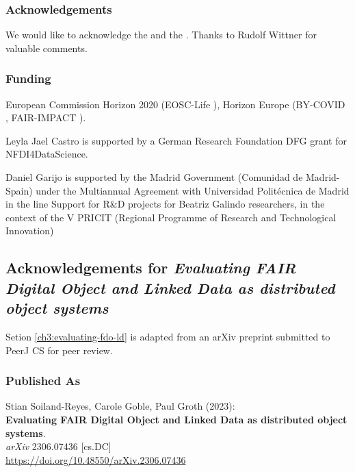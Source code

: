 \subsubsection*{Acknowledgements}

We would like to acknowledge the
 and the
. Thanks to Rudolf Wittner for valuable comments.

\subsubsection*{Funding}

European Commission Horizon 2020 (EOSC-Life
), Horizon
Europe (BY-COVID
,
FAIR-IMPACT
).

Leyla Jael Castro is supported by a German Research Foundation DFG grant
for NFDI4DataScience.

Daniel Garijo is supported by the Madrid Government (Comunidad de
Madrid-Spain) under the Multiannual Agreement with Universidad
Politécnica de Madrid in the line Support for R\&D projects for Beatriz
Galindo researchers, in the context of the V PRICIT (Regional Programme
of Research and Technological Innovation)


% 

\subsection{Acknowledgements for \textit{Evaluating FAIR Digital Object and Linked Data as distributed object systems}}

Setion \vref{ch3:evaluating-fdo-ld} is adapted from an arXiv preprint submitted to PeerJ CS for peer review.

\subsubsection*{Published As}

Stian Soiland-Reyes, Carole Goble, Paul Groth (2023):\\
\textbf{Evaluating FAIR Digital Object and Linked Data as distributed object systems}.\\
\emph{arXiv} 2306.07436 [cs.DC] \\
\url{https://doi.org/10.48550/arXiv.2306.07436}

